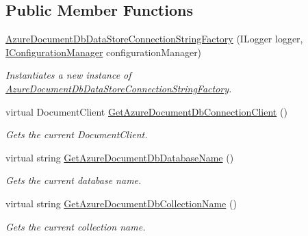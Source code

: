 \subsection*{Public Member Functions}
\begin{DoxyCompactItemize}
\item 
\hyperlink{classCqrs_1_1Azure_1_1DocumentDb_1_1Factories_1_1AzureDocumentDbDataStoreConnectionStringFactory_a9b08d89df792a20e71f5278dbf39b804_a9b08d89df792a20e71f5278dbf39b804}{Azure\+Document\+Db\+Data\+Store\+Connection\+String\+Factory} (I\+Logger logger, \hyperlink{interfaceCqrs_1_1Configuration_1_1IConfigurationManager}{I\+Configuration\+Manager} configuration\+Manager)
\begin{DoxyCompactList}\small\item\em Instantiates a new instance of \hyperlink{classCqrs_1_1Azure_1_1DocumentDb_1_1Factories_1_1AzureDocumentDbDataStoreConnectionStringFactory}{Azure\+Document\+Db\+Data\+Store\+Connection\+String\+Factory}. \end{DoxyCompactList}\item 
virtual Document\+Client \hyperlink{classCqrs_1_1Azure_1_1DocumentDb_1_1Factories_1_1AzureDocumentDbDataStoreConnectionStringFactory_a0525c318c3930076e08ed83f9829ab2c_a0525c318c3930076e08ed83f9829ab2c}{Get\+Azure\+Document\+Db\+Connection\+Client} ()
\begin{DoxyCompactList}\small\item\em Gets the current Document\+Client. \end{DoxyCompactList}\item 
virtual string \hyperlink{classCqrs_1_1Azure_1_1DocumentDb_1_1Factories_1_1AzureDocumentDbDataStoreConnectionStringFactory_a2a30d6066e2bc9c4af078b1f0a5407ab_a2a30d6066e2bc9c4af078b1f0a5407ab}{Get\+Azure\+Document\+Db\+Database\+Name} ()
\begin{DoxyCompactList}\small\item\em Gets the current database name. \end{DoxyCompactList}\item 
virtual string \hyperlink{classCqrs_1_1Azure_1_1DocumentDb_1_1Factories_1_1AzureDocumentDbDataStoreConnectionStringFactory_a0685593d04e9a905d270800c278ddb42_a0685593d04e9a905d270800c278ddb42}{Get\+Azure\+Document\+Db\+Collection\+Name} ()
\begin{DoxyCompactList}\small\item\em Gets the current collection name. \end{DoxyCompactList}\item 

\end{DoxyCompactItemize}
